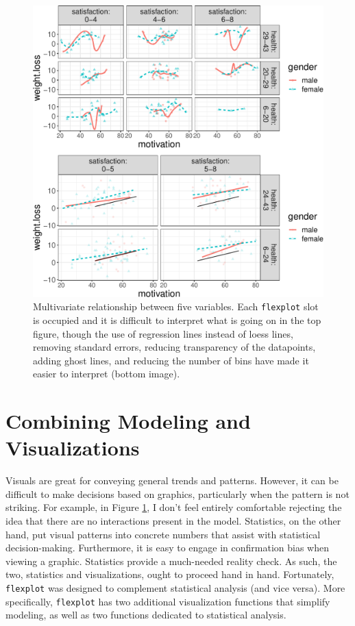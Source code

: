 \documentclass[
  man]{apa6}
\begin{document}
\begin{figure}
\centering
\includegraphics{flexplot_psychmeth_files/figure-latex/threeway-1.pdf}
\caption{\label{fig:threeway}Multivariate relationship between five variables. Each \texttt{flexplot} slot is occupied and it is difficult to interpret what is going on in the top figure, though the use of regression lines instead of loess lines, removing standard errors, reducing transparency of the datapoints, adding ghost lines, and reducing the number of bins have made it easier to interpret (bottom image). \label{fig:threeway}}
\end{figure}

\hypertarget{combining-modeling-and-visualizations}{%
\section{Combining Modeling and Visualizations}\label{combining-modeling-and-visualizations}}

Visuals are great for conveying general trends and patterns. However, it can be difficult to make decisions based on graphics, particularly when the pattern is not striking. For example, in Figure \ref{fig:threeway}, I don't feel entirely comfortable rejecting the idea that there are no interactions present in the model. Statistics, on the other hand, put visual patterns into concrete numbers that assist with statistical decision-making. Furthermore, it is easy to engage in confirmation bias when viewing a graphic. Statistics provide a much-needed reality check. As such, the two, statistics and visualizations, ought to proceed hand in hand. Fortunately, \texttt{flexplot} was designed to complement statistical analysis (and vice versa). More specifically, \texttt{flexplot} has two additional visualization functions that simplify modeling, as well as two functions dedicated to statistical analysis.
\end{document}
